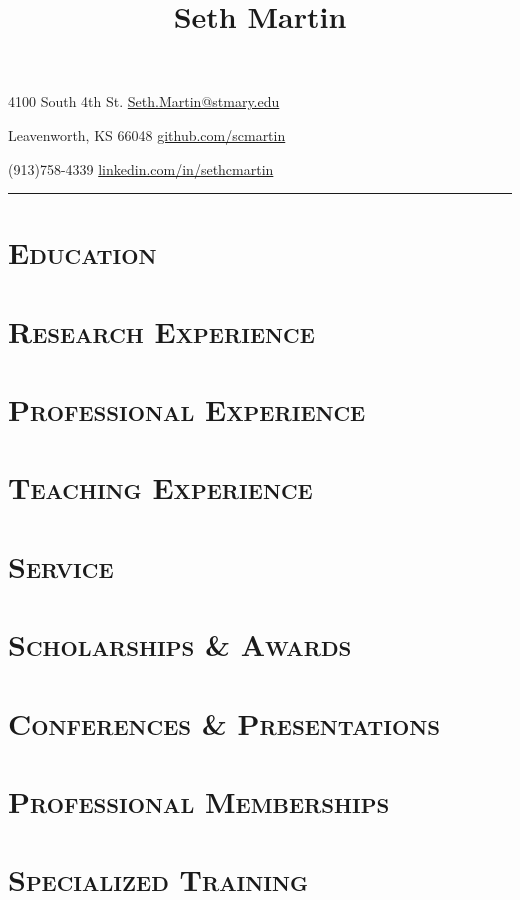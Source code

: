 \documentclass[10pt]{article}
\title{\Huge \bf Seth Martin}
\date{}
\author{}
\begin{document}
\maketitle

\setlength{\parindent}{0ex}
4100 South 4th St. \hfill \href{mailto:Seth.Martin@stmary.edu}{Seth.Martin@stmary.edu}

Leavenworth, KS 66048 \hfill \href{https://github.com/scmartin}{github.com/scmartin}

(913)758-4339 \hfill \href{https://www.linkedin.com/in/sethcmartin}{linkedin.com/in/sethcmartin}
\hrule

\allsectionsfont{\sectionrule{0ex}{0pt}{-1ex}{1pt}}

\section*{\textsc{Education}}


\section*{\textsc{Research Experience}}


\section*{\textsc{Professional Experience}}


\section*{\textsc{Teaching Experience}}


\section*{\textsc{Service}}


\section*{\textsc{Scholarships \& Awards}}


\section*{\textsc{Conferences \& Presentations}}


\section*{\textsc{Professional Memberships}}


\section*{\textsc{Specialized Training}}



\nocite{*}


\end{document}
